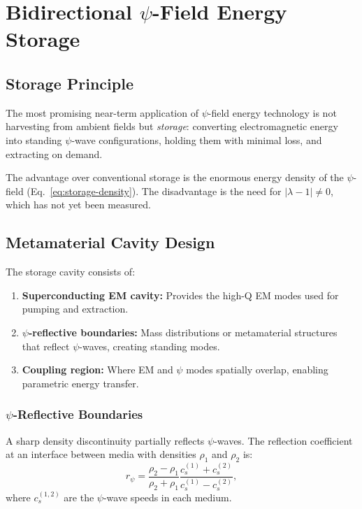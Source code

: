 \documentclass[aps,prd,twocolumn,showpacs,preprintnumbers,superscriptaddress,nofootinbib]{revtex4-2}
\begin{document}
\section{Bidirectional $\psi$-Field Energy Storage}\label{sec:storage}

\subsection{Storage Principle}\label{sec:storage-principle}

The most promising near-term application of $\psi$-field energy technology
is not harvesting from ambient fields but \emph{storage}: converting
electromagnetic energy into standing $\psi$-wave configurations, holding
them with minimal loss, and extracting on demand.

The advantage over conventional storage is the enormous energy density of
the $\psi$-field (Eq.~\ref{eq:storage-density}).  The disadvantage is the
need for $|\lambda-1| \neq 0$, which has not yet been measured.

\subsection{Metamaterial Cavity Design}\label{sec:meta-cavity}

The storage cavity consists of:
\begin{enumerate}
\item \textbf{Superconducting EM cavity:} Provides the high-Q EM modes
used for pumping and extraction.
\item \textbf{$\psi$-reflective boundaries:} Mass distributions or
metamaterial structures that reflect $\psi$-waves, creating standing
modes.
\item \textbf{Coupling region:} Where EM and $\psi$ modes spatially
overlap, enabling parametric energy transfer.
\end{enumerate}

\subsubsection{$\psi$-Reflective Boundaries}

A sharp density discontinuity partially reflects $\psi$-waves.  The
reflection coefficient at an interface between media with densities
$\rho_1$ and $\rho_2$ is:
\begin{equation}\label{eq:psi-reflection}
r_\psi = \frac{\rho_2 - \rho_1}{\rho_2 + \rho_1}\frac{c_s^{(1)} + c_s^{(2)}}{c_s^{(1)} - c_s^{(2)}},
\end{equation}
where $c_s^{(1,2)}$ are the $\psi$-wave speeds in each medium.
\end{document}
